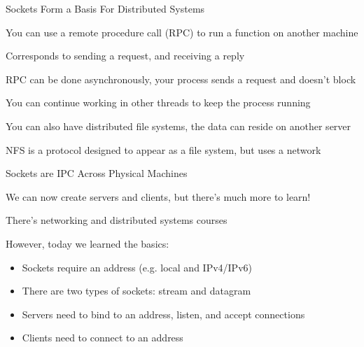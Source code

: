   \begin{frame}{Sockets Form a Basis For Distributed Systems}

    You can use a remote procedure call (RPC) to run a function on another
    machine

    \hspace{2em} Corresponds to sending a request, and receiving a reply

    \vspace{2em}

    RPC can be done asynchronously, your process sends a request and doesn't
    block

    \hspace{2em} You can continue working in other threads to keep the process
                 running

    \vspace{2em}

    You can also have distributed file systems, the data can reside on another
    server

    \hspace{2em} NFS is a protocol designed to appear as a file system, but uses
                 a network
  \end{frame}

  \begin{frame}{Sockets are IPC Across Physical Machines}

    We can now create servers and clients, but there's much more to learn!

       \hspace{2em} There's networking and distributed systems courses

    \vspace{2em}

    However, today we learned the basics:

    \begin{itemize}
      \item Sockets require an address (e.g. local and IPv4/IPv6)
      \item There are two types of sockets: stream and datagram
      \item Servers need to bind to an address, listen, and accept connections
      \item Clients need to connect to an address
    \end{itemize}
  \end{frame}

